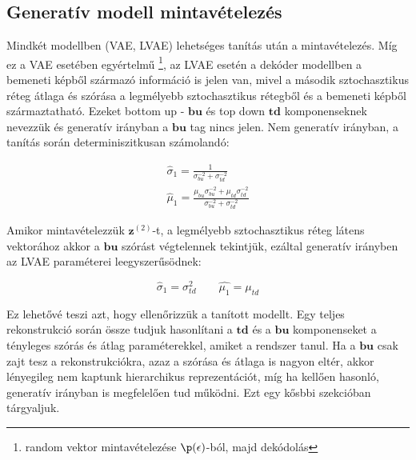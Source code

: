 \documentclass[12pt, english]{article}
\begin{document}
\vspace{5mm}

\subsection{Generatív modell mintavételezés}

\vspace{5mm}

\par Mindkét modellben (VAE, LVAE) lehetséges tanítás után a mintavételezés. Míg ez a VAE esetében egyértelmű \footnote{random vektor mintavételezése $\p(\epsilon)$-ból, majd dekódolás}, az LVAE esetén a dekóder modellben a bemeneti képből származó információ is jelen van, mivel a második sztochasztikus réteg átlaga és szórása a legmélyebb sztochasztikus rétegből és a bemeneti képből származtatható. Ezeket bottom up - $\bm{bu}$ és top down $\bm{td}$ komponenseknek nevezzük és generatív irányban a $\bm{bu}$ tag nincs jelen. Nem generatív irányban, a tanítás során determiniszitkusan számolandó:

\vspace{4mm}

\begin{gather}
    \label{eq:z1-mean-sigma-1}
    \hat{\sigma}_{1} = \frac{1}{\sigma_{bu}^{-2} + \sigma_{td}^{-2}} \\
    \hat{\mu}_{1} = \frac{\mu_{bu}\sigma_{bu}^{-2} + \mu_{td}\sigma_{td}^{-2}}{\sigma_{bu}^{-2} + \sigma_{td}^{-2}}
    \label{eq:z1-mean-sigma-2}
\end{gather}

\vspace{4mm}

\par Amikor mintavételezzük $\bm{z}^{(2)}$-t, a legmélyebb sztochasztikus réteg látens vektorához akkor a $\bm{bu}$ szórást végtelennek tekintjük, ezáltal generatív irányben az LVAE paraméterei leegyszerűsödnek:

\vspace{4mm}

\begin{equation}
    \hat{\sigma}_{1} = \sigma_{td}^{2} \quad \quad \hat{\mu_{1}} = \mu_{td}
    \label{eq:ladder-vae-sampling}
\end{equation}

\vspace{4mm}

\par Ez lehetővé teszi azt, hogy ellenőrizzük a tanított modellt. Egy teljes rekonstrukció során össze tudjuk hasonlítani a $\bm{td}$ és a $\bm{bu}$ komponenseket a tényleges szórás és átlag paraméterekkel, amiket a rendszer tanul. Ha a $\bm{bu}$ csak zajt tesz a rekonstrukciókra, azaz a szórása és átlaga is nagyon eltér, akkor lényegileg nem kaptunk hierarchikus reprezentációt, míg ha kellően hasonló, generatív irányban is megfelelően tud működni. Ezt egy kősbbi szekcióban tárgyaljuk.
\end{document}
